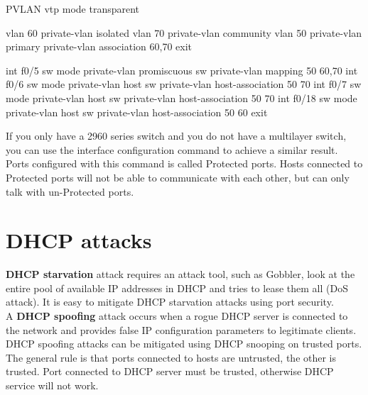 \begin{sexylisting}{PVLAN}
vtp mode transparent

vlan 60
private-vlan isolated
vlan 70
private-vlan community
vlan 50
private-vlan primary
private-vlan association 60,70
exit

int f0/5
sw mode private-vlan promiscuous
sw private-vlan mapping 50 60,70
int f0/6
sw mode private-vlan host
sw private-vlan host-association 50 70
int f0/7
sw mode private-vlan host
sw private-vlan host-association 50 70
int f0/18
sw mode private-vlan host
sw private-vlan host-association 50 60
exit
\end{sexylisting}

If you only have a 2960 series switch and you do not have a multilayer switch, you can use the  interface configuration command to achieve a similar result. Ports configured with this command is called Protected ports. Hosts connected to Protected ports will not be able to communicate with each other, but can only talk with un-Protected ports. 

\section{DHCP attacks}

\textbf{DHCP starvation} attack requires an attack tool, such as Gobbler, look at the entire pool of available IP addresses in DHCP and tries to lease them all (DoS attack). It is easy to mitigate DHCP starvation attacks using port security. \\

A \textbf{DHCP spoofing} attack occurs when a rogue DHCP server is connected to the network and provides false IP configuration parameters to legitimate clients. DHCP spoofing attacks can be mitigated using DHCP snooping on trusted ports. The general rule is that ports connected to hosts are untrusted, the other is trusted. Port connected to DHCP server must be trusted, otherwise DHCP service will not work.

